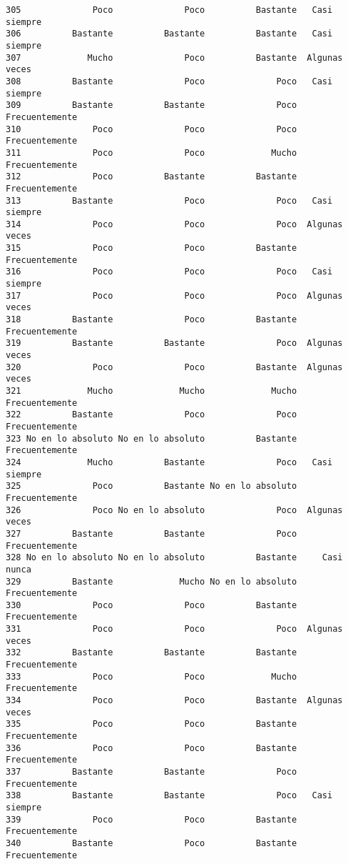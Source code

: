 \documentclass[
  letterpaper,
  DIV=11,
  numbers=noendperiod]{scrartcl}
\begin{document}
\begin{verbatim}
305              Poco              Poco          Bastante   Casi siempre
306          Bastante          Bastante          Bastante   Casi siempre
307             Mucho              Poco          Bastante  Algunas veces
308          Bastante              Poco              Poco   Casi siempre
309          Bastante          Bastante              Poco Frecuentemente
310              Poco              Poco              Poco Frecuentemente
311              Poco              Poco             Mucho Frecuentemente
312              Poco          Bastante          Bastante Frecuentemente
313          Bastante              Poco              Poco   Casi siempre
314              Poco              Poco              Poco  Algunas veces
315              Poco              Poco          Bastante Frecuentemente
316              Poco              Poco              Poco   Casi siempre
317              Poco              Poco              Poco  Algunas veces
318          Bastante              Poco          Bastante Frecuentemente
319          Bastante          Bastante              Poco  Algunas veces
320              Poco              Poco          Bastante  Algunas veces
321             Mucho             Mucho             Mucho Frecuentemente
322          Bastante              Poco              Poco Frecuentemente
323 No en lo absoluto No en lo absoluto          Bastante Frecuentemente
324             Mucho          Bastante              Poco   Casi siempre
325              Poco          Bastante No en lo absoluto Frecuentemente
326              Poco No en lo absoluto              Poco  Algunas veces
327          Bastante          Bastante              Poco Frecuentemente
328 No en lo absoluto No en lo absoluto          Bastante     Casi nunca
329          Bastante             Mucho No en lo absoluto Frecuentemente
330              Poco              Poco          Bastante Frecuentemente
331              Poco              Poco              Poco  Algunas veces
332          Bastante          Bastante          Bastante Frecuentemente
333              Poco              Poco             Mucho Frecuentemente
334              Poco              Poco          Bastante  Algunas veces
335              Poco              Poco          Bastante Frecuentemente
336              Poco              Poco          Bastante Frecuentemente
337          Bastante          Bastante              Poco Frecuentemente
338          Bastante          Bastante              Poco   Casi siempre
339              Poco              Poco          Bastante Frecuentemente
340          Bastante              Poco          Bastante Frecuentemente

\end{verbatim}
\end{document}

